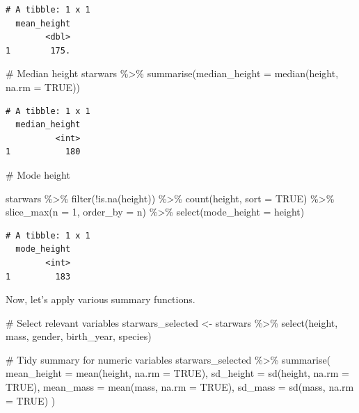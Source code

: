 \documentclass[
  man,
  floatsintext,
  longtable,
  nolmodern,
  notxfonts,
  notimes,
  colorlinks=true,linkcolor=blue,citecolor=blue,urlcolor=blue]{apa7}
\newenvironment{Shaded}{\begin{snugshade}}{\end{snugshade}}
\newcommand{\AttributeTok}[1]{\textcolor[rgb]{0.40,0.45,0.13}{#1}}
\newcommand{\CommentTok}[1]{\textcolor[rgb]{0.37,0.37,0.37}{#1}}
\newcommand{\ConstantTok}[1]{\textcolor[rgb]{0.56,0.35,0.01}{#1}}
\newcommand{\DecValTok}[1]{\textcolor[rgb]{0.68,0.00,0.00}{#1}}
\newcommand{\FunctionTok}[1]{\textcolor[rgb]{0.28,0.35,0.67}{#1}}
\newcommand{\NormalTok}[1]{\textcolor[rgb]{0.00,0.23,0.31}{#1}}
\newcommand{\OtherTok}[1]{\textcolor[rgb]{0.00,0.23,0.31}{#1}}
\newcommand{\SpecialCharTok}[1]{\textcolor[rgb]{0.37,0.37,0.37}{#1}}
\begin{document}
\begin{verbatim}
# A tibble: 1 x 1
  mean_height
        <dbl>
1        175.
\end{verbatim}

\begin{Shaded}
\begin{Highlighting}[]
\CommentTok{\# Median height}
\NormalTok{starwars }\SpecialCharTok{\%\textgreater{}\%} 
  \FunctionTok{summarise}\NormalTok{(}\AttributeTok{median\_height =} \FunctionTok{median}\NormalTok{(height, }\AttributeTok{na.rm =} \ConstantTok{TRUE}\NormalTok{))}
\end{Highlighting}
\end{Shaded}

\begin{verbatim}
# A tibble: 1 x 1
  median_height
          <int>
1           180
\end{verbatim}

\begin{Shaded}
\begin{Highlighting}[]
\CommentTok{\# Mode height}

\NormalTok{starwars }\SpecialCharTok{\%\textgreater{}\%}
  \FunctionTok{filter}\NormalTok{(}\SpecialCharTok{!}\FunctionTok{is.na}\NormalTok{(height)) }\SpecialCharTok{\%\textgreater{}\%}
  \FunctionTok{count}\NormalTok{(height, }\AttributeTok{sort =} \ConstantTok{TRUE}\NormalTok{) }\SpecialCharTok{\%\textgreater{}\%}
  \FunctionTok{slice\_max}\NormalTok{(}\AttributeTok{n =} \DecValTok{1}\NormalTok{, }\AttributeTok{order\_by =}\NormalTok{ n) }\SpecialCharTok{\%\textgreater{}\%}
  \FunctionTok{select}\NormalTok{(}\AttributeTok{mode\_height =}\NormalTok{ height)}
\end{Highlighting}
\end{Shaded}

\begin{verbatim}
# A tibble: 1 x 1
  mode_height
        <int>
1         183
\end{verbatim}

Now, let's apply various summary functions.

\begin{Shaded}
\begin{Highlighting}[]
\CommentTok{\# Select relevant variables}
\NormalTok{starwars\_selected }\OtherTok{\textless{}{-}}\NormalTok{ starwars }\SpecialCharTok{\%\textgreater{}\%}
  \FunctionTok{select}\NormalTok{(height, mass, gender, birth\_year, species)}

\CommentTok{\# Tidy summary for numeric variables}
\NormalTok{starwars\_selected }\SpecialCharTok{\%\textgreater{}\%}
  \FunctionTok{summarise}\NormalTok{(}
    \AttributeTok{mean\_height =} \FunctionTok{mean}\NormalTok{(height, }\AttributeTok{na.rm =} \ConstantTok{TRUE}\NormalTok{),}
    \AttributeTok{sd\_height =} \FunctionTok{sd}\NormalTok{(height, }\AttributeTok{na.rm =} \ConstantTok{TRUE}\NormalTok{),}
    \AttributeTok{mean\_mass =} \FunctionTok{mean}\NormalTok{(mass, }\AttributeTok{na.rm =} \ConstantTok{TRUE}\NormalTok{),}
    \AttributeTok{sd\_mass =} \FunctionTok{sd}\NormalTok{(mass, }\AttributeTok{na.rm =} \ConstantTok{TRUE}\NormalTok{)}
\NormalTok{  )}
\end{Highlighting}
\end{Shaded}
\end{document}
